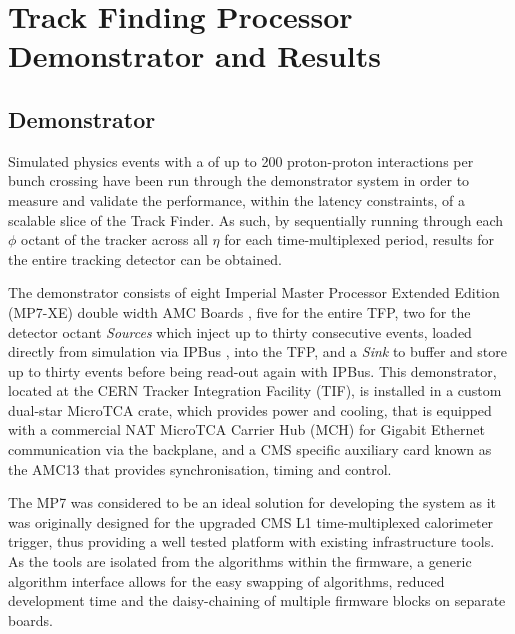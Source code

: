 \section{Track Finding Processor Demonstrator and Results}\label{sec:tf-results}
\subsection{Demonstrator}
Simulated physics events with a \PU of up to 200 proton-proton interactions per bunch crossing have been run through the demonstrator system in order to measure and validate the performance, within the latency constraints, of a scalable slice of the Track Finder. As such, by sequentially running through each $\phi$ octant of the tracker across all $\eta$ for each time-multiplexed period, results for the entire tracking detector can be obtained.

The demonstrator consists of eight Imperial Master Processor Extended Edition (MP7-XE) double width AMC Boards \cite{mp7ref}, five for the entire TFP, two for the detector octant \textit{Sources} which inject up to thirty consecutive events, loaded directly from simulation via IPBus \cite{IPBus}, into the TFP, and a \textit{Sink} to buffer and store up to thirty events before being read-out again with IPBus. This demonstrator, located at the CERN Tracker Integration Facility (TIF), is installed in a custom dual-star MicroTCA \cite{uTCA} crate, which provides power and cooling, that is equipped with a commercial NAT MicroTCA Carrier Hub (MCH) for Gigabit Ethernet communication via the backplane, and a CMS specific auxiliary card known as the AMC13 \cite{AMC13} that provides synchronisation, timing and control.

The MP7 was considered to be an ideal solution for developing the system  as it was originally designed for the upgraded CMS L1 time-multiplexed calorimeter trigger, thus providing a well tested platform with existing infrastructure tools. As the tools are isolated from the algorithms within the firmware, a generic algorithm interface allows for the easy swapping of algorithms, reduced development time and the daisy-chaining of multiple firmware blocks on separate boards. 


